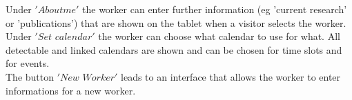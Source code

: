 \documentclass[article,colorback,accentcolor=tud4c, 11pt]{tudreport}
\begin{document}
Under $'About me'$ the worker can enter further information (eg 'current research' or 'publications') that are shown on the tablet when a visitor selects the worker.\\ 



Under $'Set$ $calendar'$ the worker can choose what calendar to use for what. All detectable and linked calendars are shown and can be chosen for time slots and for events.\\

The button $'New$ $Worker'$ leads to an interface that allows the worker to enter informations for a new worker.
 
 
	
	
	
	\listoffigures{}
\end{document}
